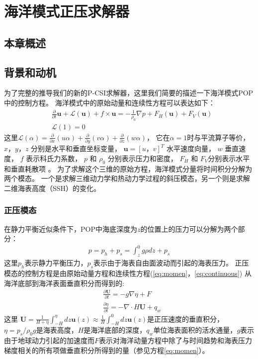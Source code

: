 \chapter{海洋模式正压求解器}
\label{cha:barosSolver}

\section{本章概述}

\section{背景和动机}
\label{sec:baroBackgroud} 
为了完整的推导我们的新的P-CSI求解器，这里我们简要的描述一下海洋模式POP中的控制方程。
海洋模式中的原始动量和连续性方程可以表达如下：
\begin{align}
&\frac{\partial }{\partial t} \textbf{u} +\mathcal{L}(\textbf{u}) + f\times \textbf{u} = - \frac{1}{\rho_0}\nabla p +F_H(\textbf{u}) +F_V(\textbf{u}) \label{eq:momen}\\
&\mathcal{L}(1) = 0 \label{eq:continuous}
\end{align}
这里$\mathcal{L}(\alpha ) = \frac{\partial }{\partial x} (u\alpha)  +\frac{\partial }{\partial y} (v\alpha) +\frac{\partial }{\partial z} (w\alpha)$， 它在$\alpha =1$时与平流算子等价， $x，y，z$ 分别是水平和垂直坐标变量， $\textbf{u} = [u，v]^T$ 水平速度向量， $w$ 垂直速度， $f$ 表示科氏力系数，  $p$ 和 $\rho_0$ 分别表示压力和密度， $F_H$ 和 $F_V$分别表示水平和垂直耗散项 \citep{smith2010parallel}。  
为了求解这个三维的原始方程，海洋模式分量将时间积分分解为两个模态。 一个是求解三维动力学和热动力学过程的斜压模态，另一个则是求解二维海表高度（SSH）的变化。

\subsection{正压模态} \label{se:baro_mode}


  
在静力平衡近似条件下，POP中海底深度为$z$的位置上的压力可以分解为两个部分：  
\begin{align}
\displaystyle p = p_h + p_s = \int^0_z g\rho dz +p_s
\end{align}
这里$p_h$表示静力平衡压力，$p_s$表示由于海表自由面波动而引起的海表压力。 
正压模态的控制方程是由原始动量方程和连续性方程(\ref{eq:momen}，\ref{eq:continuous}) 从海洋底部到海洋表面垂直积分而得到的:
\begin{align}
&\displaystyle \frac{\partial \textbf{U} }{\partial t}  = -g \nabla \eta + F  \label{eq:baro_mon}\\
&\displaystyle \frac{\partial \eta }{\partial t} = - \nabla \cdot H\textbf{U} + q_w  \label{eq:baro_con}
\end{align}
这里  $\textbf{U} =  \frac{1}{H+\eta}\int_{-H}^\eta dz \textbf{u}(z) \approx \frac{1}{H }\int_{-H}^0 dz \textbf{u}(z)$是正压速度的垂直积分，
$\eta = p_s/{\rho_0g}$是海表高度，$H$是海洋底部的深度，$q_w$单位海表面积的活水通量，$g$表示由于地球动力引起的加速度而$F$表示对海洋动量方程中除了与时间趋势和海表压力梯度相关的所有项做垂直积分所得到的量（参见方程\ref{eq:momen}）。
 
